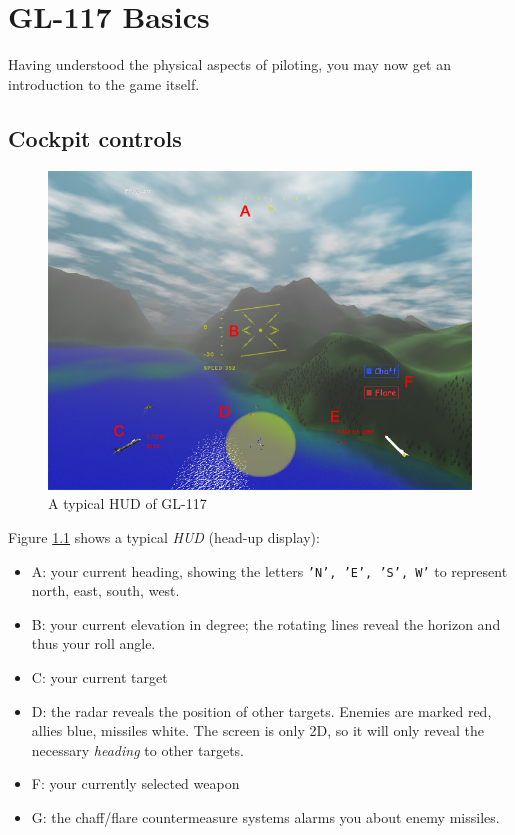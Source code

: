 \chapter{GL-117 Basics}
\label{chap:basics}

Having understood the physical aspects of piloting,
you may now get an introduction to the game itself.


\section{Cockpit controls}
\label{sec:cockpit}

\begin{figure}
\begin{center}
\includegraphics[width=12cm]{hud.jpg}
\caption{A typical HUD of GL-117}
\label{fig:hud}
\end{center}
\end{figure}

Figure \ref{fig:hud} shows a typical \textit{HUD} (head-up display):
\begin{itemize}
\item{A: your current heading, showing the letters \texttt{'N', 'E', 'S', W'}
to represent north, east, south, west.}
\item{B: your current elevation in degree; the rotating lines reveal the
horizon and thus your roll angle.}
\item{C: your current target}
\item{D: the radar reveals the position of other targets. Enemies are marked red,
allies blue, missiles white. The screen is only 2D, so it will only reveal the necessary \textit{heading} to
other targets.}
\item{F: your currently selected weapon}
\item{G: the chaff/flare countermeasure systems alarms you about enemy missiles.}
\end{itemize}



